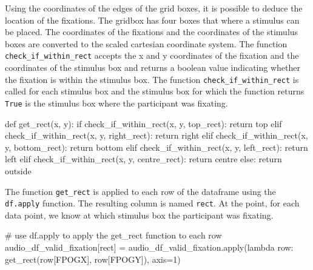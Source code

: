 \documentclass[
  a4paper,
]{article}
\newenvironment{Shaded}{}{}
\newcommand{\BuiltInTok}[1]{\textcolor[rgb]{0.84,0.23,0.29}{#1}}
\newcommand{\CommentTok}[1]{\textcolor[rgb]{0.42,0.45,0.49}{#1}}
\newcommand{\ControlFlowTok}[1]{\textcolor[rgb]{0.84,0.23,0.29}{#1}}
\newcommand{\DecValTok}[1]{\textcolor[rgb]{0.00,0.36,0.77}{#1}}
\newcommand{\KeywordTok}[1]{\textcolor[rgb]{0.84,0.23,0.29}{#1}}
\newcommand{\NormalTok}[1]{\textcolor[rgb]{0.14,0.16,0.18}{#1}}
\newcommand{\OperatorTok}[1]{\textcolor[rgb]{0.14,0.16,0.18}{#1}}
\newcommand{\StringTok}[1]{\textcolor[rgb]{0.01,0.18,0.38}{#1}}
\begin{document}
Using the coordinates of the edges of the grid boxes, it is possible to
deduce the location of the fixations. The gridbox has four boxes that
where a stimulus can be placed. The coordinates of the fixations and the
coordinates of the stimulus boxes are converted to the scaled cartesian
coordinate system. The function \texttt{check\_if\_within\_rect} accepts
the x and y coordinates of the fixation and the coordinates of the
stimulus box and returns a boolean value indicating whether the fixation
is within the stimulus box. The function
\texttt{check\_if\_within\_rect} is called for each stimulus box and the
stimulus box for which the function returns \texttt{True} is the
stimulus box where the participant was fixating.

\begin{Shaded}
\begin{Highlighting}[]
\KeywordTok{def}\NormalTok{ get\_rect(x, y):}
    \ControlFlowTok{if}\NormalTok{ check\_if\_within\_rect(x, y, top\_rect):}
        \ControlFlowTok{return} \StringTok{\textquotesingle{}top\textquotesingle{}}
    \ControlFlowTok{elif}\NormalTok{ check\_if\_within\_rect(x, y, right\_rect):}
        \ControlFlowTok{return} \StringTok{\textquotesingle{}right\textquotesingle{}}
    \ControlFlowTok{elif}\NormalTok{ check\_if\_within\_rect(x, y, bottom\_rect):}
        \ControlFlowTok{return} \StringTok{\textquotesingle{}bottom\textquotesingle{}}
    \ControlFlowTok{elif}\NormalTok{ check\_if\_within\_rect(x, y, left\_rect):}
        \ControlFlowTok{return} \StringTok{\textquotesingle{}left\textquotesingle{}}
    \ControlFlowTok{elif}\NormalTok{ check\_if\_within\_rect(x, y, centre\_rect):}
        \ControlFlowTok{return} \StringTok{\textquotesingle{}centre\textquotesingle{}}
    \ControlFlowTok{else}\NormalTok{:}
        \ControlFlowTok{return} \StringTok{\textquotesingle{}outside\textquotesingle{}}
\end{Highlighting}
\end{Shaded}

The function \texttt{get\_rect} is applied to each row of the dataframe
using the \texttt{df.apply} function. The resulting column is named
\texttt{rect}. At the point, for each data point, we know at which
stimulus box the participant was fixating.

\begin{Shaded}
\begin{Highlighting}[]
\CommentTok{\# use df.apply to apply the get\_rect function to each row}
\NormalTok{audio\_df\_valid\_fixation[}\StringTok{\textquotesingle{}rect\textquotesingle{}}\NormalTok{] }\OperatorTok{=}\NormalTok{ audio\_df\_valid\_fixation.}\BuiltInTok{apply}\NormalTok{(}\KeywordTok{lambda}\NormalTok{ row: get\_rect(row[}\StringTok{\textquotesingle{}FPOGX\textquotesingle{}}\NormalTok{], row[}\StringTok{\textquotesingle{}FPOGY\textquotesingle{}}\NormalTok{]), axis}\OperatorTok{=}\DecValTok{1}\NormalTok{)}
\end{Highlighting}
\end{Shaded}
\end{document}
